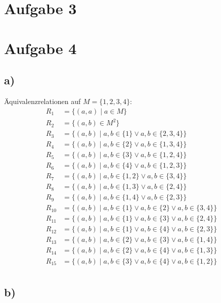 \documentclass[a4paper]{scrartcl}
\begin{document}
\section*{Aufgabe 3}

\section*{Aufgabe 4}
\subsection*{a)}
Äquivalenzrelationen auf $M = \{1,2,3,4\}$:
\begin{align*}
    R_1 &= \{(a,a) \mid a \in M \} \\
    R_2 &= \{(a,b) \in M^2 \} \\
    R_3 &= \{(a,b) \mid a,b \in \{ 1 \} \lor a, b \in \{2, 3, 4\}  \} \\
    R_4 &= \{(a,b) \mid a,b \in \{ 2 \} \lor a, b \in \{1, 3, 4\}  \} \\
    R_5 &= \{(a,b) \mid a,b \in \{ 3 \} \lor a, b \in \{1, 2, 4\}  \} \\
    R_6 &= \{(a,b) \mid a,b \in \{ 4 \} \lor a, b \in \{1, 2, 3\}  \} \\
    R_7 &= \{(a,b) \mid a,b \in \{ 1,2 \} \lor a, b \in \{3 ,4\}  \} \\
    R_8 &= \{(a,b) \mid a,b \in \{ 1,3 \} \lor a, b \in \{2 ,4\}  \} \\
    R_9 &= \{(a,b) \mid a,b \in \{ 1,4 \} \lor a, b \in \{2 ,3\}  \} \\
    R_{10} &= \{(a,b) \mid a,b \in \{ 1 \} \lor a, b \in \{2\} \lor a,b \in \{ 3,4 \} \} \\
    R_{11} &= \{(a,b) \mid a,b \in \{ 1 \} \lor a, b \in \{3\} \lor a,b \in \{ 2,4 \} \} \\
    R_{12} &= \{(a,b) \mid a,b \in \{ 1 \} \lor a, b \in \{4\} \lor a,b \in \{ 2,3 \} \} \\
    R_{13} &= \{(a,b) \mid a,b \in \{ 2 \} \lor a, b \in \{3\} \lor a,b \in \{ 1,4 \} \} \\
    R_{14} &= \{(a,b) \mid a,b \in \{ 2 \} \lor a, b \in \{4\} \lor a,b \in \{ 1,3 \} \} \\
    R_{15} &= \{(a,b) \mid a,b \in \{ 3 \} \lor a, b \in \{4\} \lor a,b \in \{ 1,2 \} \} \\
\end{align*}

\subsection*{b)}
\end{document}
